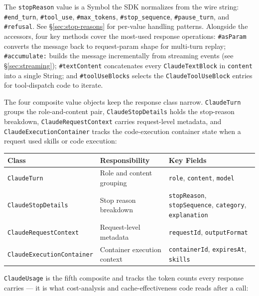 \documentclass[a4paper,10pt,fleqn]{article}
\newcommand{\cls}[1]{\texttt{#1}}
\newcommand{\sel}[1]{\texttt{\##1}}
\begin{document}
The \texttt{stopReason} value is a Symbol the SDK normalizes
from the wire string: \texttt{\#end\_turn}, \texttt{\#tool\_use},
\texttt{\#max\_tokens}, \texttt{\#stop\_sequence},
\texttt{\#pause\_turn}, and \texttt{\#refusal}.  See
\S\ref{sec:stop-reasons} for per-value handling patterns.
Alongside the accessors, four key methods cover the
most-used response operations: \sel{asParam} converts the
message back to request-param shape for multi-turn replay;
\sel{accumulate:} builds the message incrementally from
streaming events (see \S\ref{sec:streaming}); \sel{textContent}
concatenates every \cls{ClaudeTextBlock} in \texttt{content}
into a single String; and \sel{toolUseBlocks} selects the
\cls{ClaudeToolUseBlock} entries for tool-dispatch code to
iterate.

The four composite value objects keep the response class
narrow.  \cls{ClaudeTurn} groups the role-and-content pair,
\cls{ClaudeStopDetails} holds the stop-reason breakdown,
\cls{ClaudeRequestContext} carries request-level metadata, and
\cls{ClaudeExecutionContainer} tracks the code-execution
container state when a request used skills or code execution:

\begin{center}
\small
\begin{tabular}{@{}llp{5.5cm}@{}}
\toprule
\textbf{Class} & \textbf{Responsibility} & \textbf{Key Fields} \\
\midrule
\cls{ClaudeTurn}             & Role and content grouping   & \texttt{role}, \texttt{content}, \texttt{model} \\
\cls{ClaudeStopDetails}      & Stop reason breakdown       & \texttt{stopReason}, \texttt{stopSequence}, \texttt{category}, \texttt{explanation} \\
\cls{ClaudeRequestContext}   & Request-level metadata      & \texttt{requestId}, \texttt{outputFormat} \\
\cls{ClaudeExecutionContainer} & Container execution context & \texttt{containerId}, \texttt{expiresAt}, \texttt{skills} \\
\bottomrule
\end{tabular}
\end{center}

\cls{ClaudeUsage} is the fifth composite and tracks the token
counts every response carries --- it is what cost-analysis and
cache-effectiveness code reads after a call:
\end{document}
